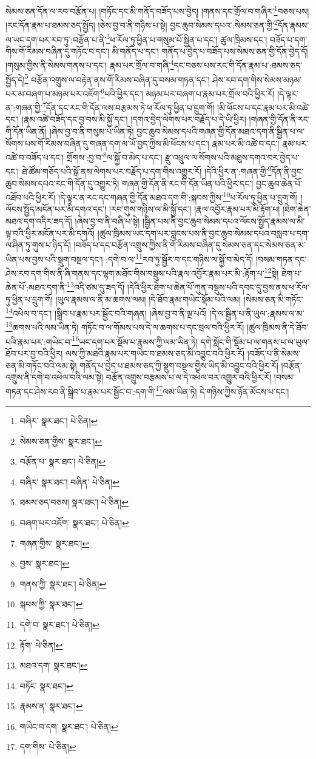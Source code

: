 སེམས་ཅན་དོན་ལ་རབ་བརྩོན་པ། །གཏོང་དང་མི་གནོད་བཟོད་པས་བྱེད། །གནས་དང་གྲོལ་བ་གཞིར་\footnote{བཞིར་  སྣར་ཐང་།  པེ་ཅིན། }བཅས་པས། །རང་དོན་རྣམ་པ་ཐམས་ཅད་སྤྱོད། །ཅེས་བྱ་བ་ནི་གཉིས་པ་སྟེ། བྱང་ཆུབ་སེམས་དཔའ་:སེམས་ཅན་གྱི་\footnote{སེམས་ཅན་གྱིས་  སྣར་ཐང་། }དོན་རྣམས་ལ་ཡང་དག་པར་རབ་ཏུ་:བརྩོན་པ་ནི་\footnote{བརྩོན་པ་  སྣར་ཐང་།  པེ་ཅིན། }ཕ་རོལ་ཏུ་ཕྱིན་པ་གསུམ་པོ་སྦྱིན་པ་དང་། ཚུལ་ཁྲིམས་དང་། བཟོད་པ་དག་གིས་གོ་རིམས་བཞིན་དུ་གཏོང་བ་དང་། མི་གནོད་པ་དང་། གནོད་པ་བྱེད་པ་བཟོད་པས་སེམས་ཅན་གྱི་དོན་བྱེད་དོ། །གསུམ་གྱིས་ནི་སེམས་གནས་པ་དང་། རྣམ་པར་གྲོལ་བ་གཞི་\footnote{བཞིར་  སྣར་ཐང་། བཞིན་  པེ་ཅིན། }དང་བཅས་པས་རང་གི་དོན་རྣམ་པ་:ཐམས་ཅད་སྤྱོད་དེ།\footnote{ཐམས་ཅད་བཅས།  སྣར་ཐང་།  པེ་ཅིན། } བརྩོན་འགྲུས་ལ་བརྟེན་ནས་གོ་རིམས་བཞིན་དུ་བསམ་གཏན་དང་། ཤེས་རབ་དག་གིས་སེམས་མཉམ་པར་མ་བཞག་པ་མཉམ་པར་འཇོག་\footnote{བཞག་པར་འཇོག་  སྣར་ཐང་།  པེ་ཅིན། }པའི་ཕྱིར་དང་། མཉམ་པར་བཞག་པ་རྣམ་པར་གྲོལ་བའི་ཕྱིར་རོ། །དེ་ལྟར་ན་:གཞན་གྱི་\footnote{གཞན་གྱིས་  སྣར་ཐང་། }དོན་དང་རང་གི་དོན་ལས་བརྩམས་ཏེ་ཕ་རོལ་ཏུ་ཕྱིན་པ་དྲུག་གོ། །མི་ཕོངས་པ་དང་རྣམ་པར་མི་འཚེ་དང་། །རྣམ་འཚེ་བཟོད་དང་བྱ་བས་མི་སྐྱོ་དང་། །དགའ་བྱེད་ལེགས་པར་བརྗོད་པ་དེ་ཡི་ཕྱིར། །གཞན་གྱི་དོན་ནི་རང་གི་དོན་ཡིན་ནོ། །ཞེས་བྱ་བ་ནི་གསུམ་པ་ཡིན་ཏེ། བྱང་ཆུབ་སེམས་དཔའི་གཞན་གྱི་དོན་མཐའ་དག་ནི་སྦྱིན་པ་ལ་སོགས་པས་གོ་རིམས་བཞིན་དུ་གཞན་དག་ལ་ཡོ་བྱད་ཀྱིས་མི་ཕོངས་པ་དང་། རྣམ་པར་མི་འཚེ་བ་དང་། རྣམ་པར་འཚེ་བ་བཟོད་པ་དང་། གྲོགས་:བྱ་བ་\footnote{བྱས་  སྣར་ཐང་། }ལ་སྐྱོ་བ་མེད་པ་དང་། རྫུ་འཕྲུལ་ལ་སོགས་པའི་མཐུས་དགའ་བར་བྱེད་པ་དང་། ཐེ་ཚོམ་གཅོད་པའི་སྒོ་ནས་ལེགས་པར་བརྗོད་པ་དག་གིས་འགྱུར་རོ། །དེའི་ཕྱིར་ན་:གཞན་གྱི་\footnote{གནས་ཀྱི་  སྣར་ཐང་།  པེ་ཅིན། }དོན་ནི་བྱང་ཆུབ་སེམས་དཔའ་རང་གི་དོན་དུ་འགྱུར་ཏེ། གཞན་གྱི་དོན་ནི་རང་གི་དོན་ཡིན་པའི་ཕྱིར་དང་། བྱང་ཆུབ་ཆེན་པོ་འཐོབ་པའི་ཕྱིར་རོ། །དེ་ལྟར་ན་རང་དང་གཞན་གྱི་དོན་མཐའ་དག་གི་:སྐབས་ཀྱིས་\footnote{སྐབས་ཀྱི་  སྣར་ཐང་། }ཕ་རོལ་ཏུ་ཕྱིན་པ་དྲུག་གོ། །ལོངས་སྤྱོད་མངོན་པར་མི་དགའ་དང་། །རབ་གུས་གཉིས་ལ་མི་སྐྱོ་དང་། །རྣལ་འབྱོར་རྣམ་པར་མི་རྟོག་པ། །ཐེག་ཆེན་མཐའ་དག་འདིར་ཟད་དོ། །ཞེས་བྱ་བ་ནི་བཞི་པ་སྟེ། །སྦྱིན་པས་ནི་བྱང་ཆུབ་སེམས་དཔའ་ལོངས་སྤྱོད་རྣམས་ལ་མི་ལྟ་བའི་ཕྱིར་མངོན་པར་མི་དགའོ། །ཚུལ་ཁྲིམས་ཡང་དག་པར་བླངས་པས་ནི་བྱང་ཆུབ་སེམས་དཔའ་བསླབ་པ་དག་ལ་ཤིན་ཏུ་གུས་པ་ཉིད་དོ། །བཟོད་པ་དང་བརྩོན་འགྲུས་ཀྱིས་ནི་གོ་རིམས་བཞིན་དུ་སེམས་ཅན་དང་སེམས་ཅན་མ་ཡིན་པས་བྱས་པའི་སྡུག་བསྔལ་དང་། :དགེ་བ་ལ་\footnote{དགེ་བ་  སྣར་ཐང་།  པེ་ཅིན། }རབ་ཏུ་སྦྱོར་བ་དང་གཉིས་ལ་སྐྱོ་བ་མེད་དོ། །བསམ་གཏན་དང་ཤེས་རབ་དག་གིས་ནི་ཞི་གནས་དང་ལྷག་མཐོང་གིས་བསྡུས་པའི་རྣལ་འབྱོར་རྣམ་པར་མི་:རྟོག་པ་\footnote{རྟོག་  པེ་ཅིན། }སྟེ། ཐེག་པ་ཆེན་པོ་:མཐའ་དག་ནི་\footnote{མཐའ་དག་  སྣར་ཐང་། }འདི་ཙམ་དུ་ཟད་དོ། །དེའི་ཕྱིར་ཐེག་པ་ཆེན་པོ་ཀུན་བསྡུས་པའི་དབང་དུ་བྱས་ནས་ཕ་རོལ་ཏུ་ཕྱིན་པ་དྲུག་གོ། །ཡུལ་རྣམས་ལ་ནི་མ་ཆགས་ལམ། །དེ་ཐོབ་རྣམ་གཡེང་སྡོམ་པའི་ལམ། །སེམས་ཅན་མི་གཏོང་\footnote{བཏོང་  སྣར་ཐང་། }འཕེལ་བ་དང་། །སྒྲིབ་པ་རྣམ་པར་སྦྱོང་བའི་གཞན། །ཞེས་བྱ་བ་ནི་ལྔ་པའོ། །དེ་ལ་སྦྱིན་པ་ནི་ཡུལ་:རྣམས་ལ་མ་\footnote{རྣམས་ན་  སྣར་ཐང་། }ཆགས་པའི་ལམ་ཡིན་ཏེ། གཏོང་བ་ལ་གོམས་པས་དེ་ལ་ཆགས་པ་དང་བྲལ་བའི་ཕྱིར་རོ། །ཚུལ་ཁྲིམས་ནི་དེ་ཐོབ་པའི་རྣམ་པར་:གཡེང་བ་\footnote{གཡེང་བ་དག་  སྣར་ཐང་།  པེ་ཅིན། }ཡང་དག་པར་སྡོམ་པ་རྣམས་ཀྱི་ལམ་ཡིན་ཏེ། དགེ་སློང་གི་སྡོམ་པ་ལ་གནས་པ་ལ་ཡུལ་ཐོབ་པར་བྱ་བའི་ཕྱིར། ལས་ཀྱི་མཐའི་རྣམ་པར་གཡེང་བ་ཐམས་ཅད་མི་འབྱུང་བའི་ཕྱིར་རོ། །བཟོད་པ་ནི་སེམས་ཅན་མི་གཏོང་བའི་ལམ་སྟེ། གནོད་པ་བྱེད་པ་ཐམས་ཅད་ཀྱི་སྡུག་བསྔལ་གྱིས་ཡིད་མི་འབྱུང་བའི་ཕྱིར་རོ། །བརྩོན་འགྲུས་ནི་དགེ་བ་འཕེལ་བའི་ལམ་སྟེ། བརྩོན་འགྲུས་བརྩམས་པ་ལ་དེ་འཕེལ་བར་འགྱུར་བའི་ཕྱིར་རོ། །བསམ་གཏན་དང་ཤེས་རབ་ནི་སྒྲིབ་པ་རྣམ་པར་སྦྱོང་བ་:དག་གི་\footnote{དག་གིས་  པེ་ཅིན། }ལམ་ཡིན་ཏེ། དེ་གཉིས་ཀྱིས་ཉོན་མོངས་པ་དང་། 